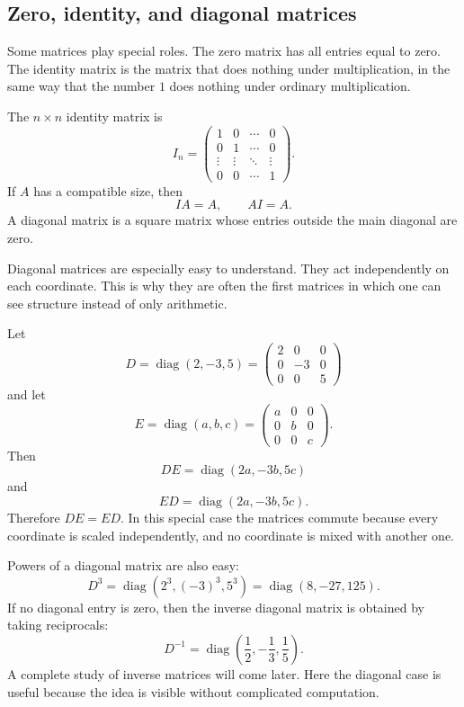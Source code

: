 \subsection{Zero, identity, and diagonal matrices}

Some matrices play special roles. The zero matrix has all entries equal to zero. The identity matrix is the matrix that does nothing under multiplication, in the same way that the number \(1\) does nothing under ordinary multiplication.

\begin{definitionbox}
The \(n\times n\) identity matrix is
\[
I_n=
\begin{pmatrix}
1 & 0 & \cdots & 0\\
0 & 1 & \cdots & 0\\
\vdots & \vdots & \ddots & \vdots\\
0 & 0 & \cdots & 1
\end{pmatrix}.
\]
If \(A\) has a compatible size, then
\[
I A=A,
\qquad
A I=A.
\]
A diagonal matrix is a square matrix whose entries outside the main diagonal are zero.
\end{definitionbox}

Diagonal matrices are especially easy to understand. They act independently on each coordinate. This is why they are often the first matrices in which one can see structure instead of only arithmetic.

\begin{examplebox}
Let
\[
D=\operatorname{diag}(2,-3,5)
=
\begin{pmatrix}
2 & 0 & 0\\
0 & -3 & 0\\
0 & 0 & 5
\end{pmatrix}
\]
and let
\[
E=\operatorname{diag}(a,b,c)
=
\begin{pmatrix}
a & 0 & 0\\
0 & b & 0\\
0 & 0 & c
\end{pmatrix}.
\]
Then
\[
DE=\operatorname{diag}(2a,-3b,5c)
\]
and
\[
ED=\operatorname{diag}(2a,-3b,5c).
\]
Therefore \(DE=ED\). In this special case the matrices commute because every coordinate is scaled independently, and no coordinate is mixed with another one.
\end{examplebox}

Powers of a diagonal matrix are also easy:
\[
D^3=\operatorname{diag}(2^3,(-3)^3,5^3)
=\operatorname{diag}(8,-27,125).
\]
If no diagonal entry is zero, then the inverse diagonal matrix is obtained by taking reciprocals:
\[
D^{-1}=\operatorname{diag}\left(\frac12,-\frac13,\frac15\right).
\]
A complete study of inverse matrices will come later. Here the diagonal case is useful because the idea is visible without complicated computation.

